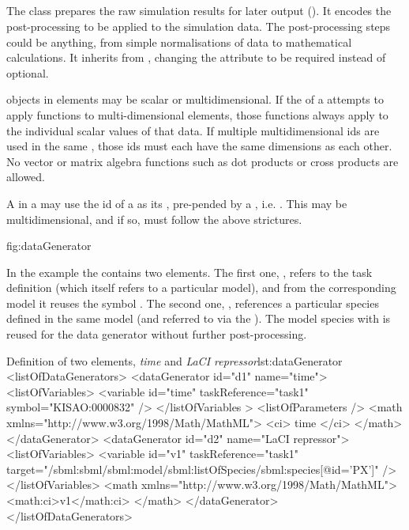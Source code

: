 \subsection{}
\label{class:dataGenerator}

The  class prepares the raw simulation results for later output (). It encodes the post-processing  to be applied to the simulation data. The post-processing steps could be anything, from simple normalisations of data to mathematical calculations.  It inherits from \Calculation, changing the  attribute to be required instead of optional.

\begin{blockChanged}
\Variable objects in \DataGenerator elements may be scalar or multidimensional.  If the \Math of a \DataGenerator attempts to apply functions to multi-dimensional elements, those functions always apply to the individual scalar values of that data.  If multiple multidimensional \Variable ids are used in the same \Math, those ids must each have the same dimensions as each other.  No vector or matrix algebra functions such as dot products or cross products are allowed.

A \Variable in a \DataGenerator may use the id of a \DataSource as its , pre-pended by a , i.e. .  This \Variable may be multidimensional, and if so, must follow the above strictures.
\end{blockChanged}

 {fig:dataGenerator}


In the example the  contains two  elements. 
The first one, , refers to the task definition  (which itself refers to a particular model), and from the corresponding model it reuses the symbol . The second one, , references a particular species defined in the same model (and referred to via the ). The model species with   is reused for the data generator  without further post-processing.
\begin{myXmlLst}{Definition of two  elements, \emph{time} and \emph{LaCI repressor}}{lst:dataGenerator}
<listOfDataGenerators>
	<dataGenerator id="d1" name="time">
		<listOfVariables>
			<variable id="time" taskReference="task1" symbol="KISAO:0000832" />
		</listOfVariables >
		<listOfParameters />
		<math xmlns="http://www.w3.org/1998/Math/MathML">
			<ci> time </ci>
		</math>
	</dataGenerator>
	<dataGenerator id="d2" name="LaCI repressor">
		<listOfVariables>
			<variable id="v1" taskReference="task1" 
				target="/sbml:sbml/sbml:model/sbml:listOfSpecies/sbml:species[@id='PX']" />
		</listOfVariables>
		<math xmlns="http://www.w3.org/1998/Math/MathML">
			<math:ci>v1</math:ci>
		</math>
	</dataGenerator>
</listOfDataGenerators>
\end{myXmlLst}

